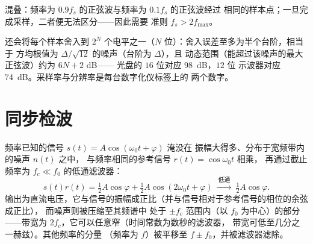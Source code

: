 \begin{omfigure}

{\small 混叠：频率为 $0.9f_s$ 的正弦波与频率为 $0.1f_s$ 的正弦波经过
相同的样本点；一旦完成采样，二者便无法区分——因此需要
准则 $f_s > 2f_{\max}$。}
\end{omfigure}

\begin{remark}[量化]\label{rem:b2:feedback-oscillators:quantization}
还会将每个样本舍入到
$2^N$ 个电平之一（$N$ 位）：舍入误差至多为半个台阶，相当于
方均根值为 $\Delta/\sqrt{12}$ 的噪声（台阶为 $\Delta$），且
动态范围（能超过该噪声的最大正弦波）约为 $6N + 2$ dB——
光盘的 $16$ 位对应 \qty{98}{dB}，$12$ 位
示波器对应 \qty{74}{dB}。采样率与分辨率是每台数字化仪标签上的
两个数字。
\end{remark}

\section{同步检波}

\begin{proposition}[同步（锁相）检波]\label{prop:b2:feedback-oscillators:lockin}
频率已知的信号 $s(t) = A\cos(\omega_0t + \varphi)$ 淹没在
振幅大得多、分布于宽频带内的噪声 $n(t)$ 之中，
与频率相同的参考信号 $r(t) = \cos\omega_0t$ 相乘，
再通过截止频率为 $f_c \ll f_0$ 的低通滤波器：
\[
s(t)r(t) = \tfrac12A\cos\varphi + \tfrac12A\cos(2\omega_0t + \varphi)
\ \xrightarrow{\ \text{低通}\ }\ \tfrac12A\cos\varphi .
\]
输出为直流电压，它与信号的振幅成正比（并与信号相对于参考信号的相位的余弦成正比），
而噪声则被压缩至其频谱中
处于 $\pm f_c$ 范围内（以 $f_0$ 为中心）的部分
——带宽为 $2f_c$，它可以任意窄（时间常数为数秒的滤波器，
带宽可低至几分之一赫兹）。其他频率的分量
（频率为 $f$）被平移至 $f \pm f_0$，并被滤波器滤除。
\end{proposition}

